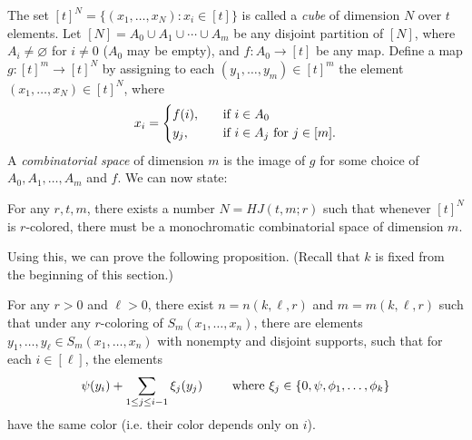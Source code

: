 The set $[t]^N = \{(x_1, \ldots, x_N): x_i \in [t] \}$ is called a \textit{cube} of dimension $N$ over $t$ elements. Let $[N] = A_0 \cup A_1 \cup \cdots \cup A_m$ be any disjoint partition of $[N]$, where $A_i \neq \varnothing$ for $i \neq 0$ ($A_0$ may be empty), and $f: A_0 \rightarrow [t]$ be any map. Define a map $g: [t]^m \rightarrow [t]^N$ by assigning to each $(y_1, \ldots, y_m) \in [t]^m$ the element $(x_1, \ldots, x_N) \in [t]^N$, where
\begin{equation}
x_i = 
\begin{cases}
f(i), \quad &\textup{if}\ i \in A_0 \\
y_j, \quad &\textup{if}\ i \in A_j \text{ for }j \in [m].
\end{cases}
\end{equation}
A \textit{combinatorial space} of dimension $m$ is the image of $g$ for some choice of $A_0, A_1, \ldots, A_m$ and $f$. We can now state:

\begin{theorem} For any $r, t, m$, there exists a number $N=HJ(t, m;r)$ such that whenever $[t]^N$ is $r$-colored, there must be a monochromatic combinatorial space of dimension $m$.
\end{theorem}

Using this, we can prove the following proposition. (Recall that $k$ is fixed from the beginning of this section.)

\begin{proposition} \label{prop:mpc}
 For any $r>0$ and $\ell >0$, there exist $n=n(k,\ell, r)$ and $m=m(k,\ell, r)$ such that under any $r$-coloring of $S_{m}(x_1,\ldots, x_n)$, there are elements 
$y_1, \ldots, y_\ell \in S_m(x_1,\ldots, x_n)$ with nonempty and disjoint supports, such that for each $i \in [\ell]$, the elements
\[
\psi(y_i) + \sum_{1 \leq j \leq i-1} \xi_j (y_j) \qquad \textup{ where } \xi_j \in \{ 0, \psi, \phi_1, \ldots, \phi_k \}
\]
have the same color (i.e. their color depends only on $i$).
\end{proposition}

